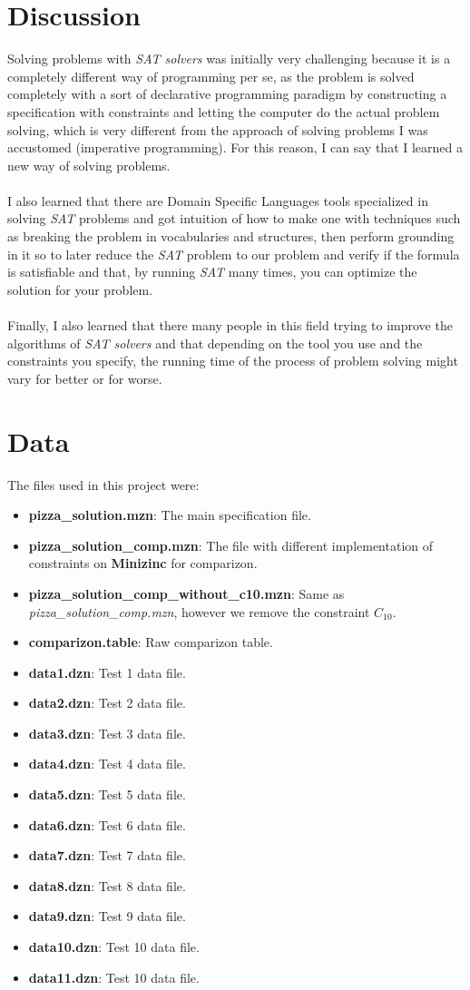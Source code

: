 \documentclass[conference]{IEEEtran}
\newcommand\tab[1][0.3cm]{\hspace*{#1}}
\begin{document}
\section{Discussion}
Solving problems with \textit{SAT solvers} was initially very challenging because it is a completely different way of programming per se, as the problem is solved completely with a sort of declarative programming paradigm by constructing a specification with constraints and letting the computer do the actual problem solving, which is very different from the approach of solving problems I was accustomed (imperative programming). For this reason, I can say that I learned a new way of solving problems.
\\
\\
\tab I also learned that there are Domain Specific Languages tools specialized in solving \textit{SAT} problems and got intuition of how to make one with techniques such as breaking the problem in vocabularies and structures, then perform grounding in it so to later reduce the \textit{SAT} problem to our problem and verify if the formula is satisfiable and that, by running \textit{SAT} many times, you can optimize the solution for your problem.
\\
\\
\tab Finally, I also learned that there many people in this field trying to improve the algorithms of \textit{SAT solvers} and that depending on the tool you use and the constraints you specify, the running time of the process of problem solving might vary for better or for worse.
\section{Data}
The files used in this project were:
\begin{itemize}
\item \textbf{pizza\_solution.mzn}: The main specification file.
\item \textbf{pizza\_solution\_comp.mzn}: The file with different implementation of constraints on \textbf{Minizinc} for comparizon.
\item \textbf{pizza\_solution\_comp\_without\_c10.mzn}: Same as \textit{pizza\_solution\_comp.mzn}, however we remove the constraint $C_{10}$.
\item \textbf{comparizon.table}: Raw comparizon table.
\item \textbf{data1.dzn}: Test 1 data file.
\item \textbf{data2.dzn}: Test 2 data file.
\item \textbf{data3.dzn}: Test 3 data file.
\item \textbf{data4.dzn}: Test 4 data file.
\item \textbf{data5.dzn}: Test 5 data file.
\item \textbf{data6.dzn}: Test 6 data file.
\item \textbf{data7.dzn}: Test 7 data file.
\item \textbf{data8.dzn}: Test 8 data file.
\item \textbf{data9.dzn}: Test 9 data file.
\item \textbf{data10.dzn}: Test 10 data file.
\item \textbf{data11.dzn}: Test 10 data file.
\end{itemize}
\end{document}
